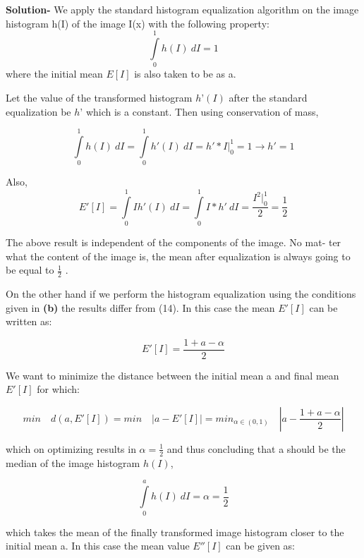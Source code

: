 \documentclass{article}
\begin{document}
\textbf{Solution-}
We apply the standard histogram equalization algorithm on the image
histogram h(I) of the image I(x) with the following property:
\begin{equation}\int\limits_0^1 h(I)\ dI = 1\end{equation}
where the initial mean $E[I]$ is also taken to be as a. 

Let the value of the transformed histogram $h’(I)$ after the standard equalization be $h’$ which is a constant.
Then using conservation of mass,

\begin{equation}\int\limits_0^1 h(I)\ dI = \int\limits_0^1 h'(I)\ dI = h'*I|_0^1 = 1 \rightarrow h' = 1\end{equation}

Also,
\begin{equation}E'[I] = \int\limits_0^1 I h'(I)\ dI = \int\limits_0^1 I*h'\ dI =\frac{I^2|_0^1}{2}=\frac{1}{2}\end{equation}

The above result is independent of the components of the image. No mat-
ter what the content of the image is, the mean after equalization is always
going to be equal to $\frac{1}{2}$ .

On the other hand if we perform the histogram equalization using the
conditions given in \textbf{(b)} the results differ from (14). In this case the mean
$E'[I]$ can be written as:

\begin{equation}E'[I] = \frac{1+a-\alpha}{2}\end{equation}

We want to minimize the distance between the initial mean a and final
mean $E'[I]$ for which:

\begin{equation}min\quad d(a,E'[I]) = min\quad|a-E'[I]| = min_{\alpha\in(0,1)} \quad|a-\frac{1+a-\alpha}{2}|\end{equation}

which on optimizing results in $\alpha = \frac{1}{2}$ and thus concluding that a should
be the median of the image histogram $h(I)$,

\begin{equation}\int\limits_0^a h(I)\ dI = \alpha = \frac{1}{2}\end{equation}

which takes the mean of the finally transformed image histogram closer
to the initial mean a. In this case the mean value $E''[I]$ can be given as:
\end{document}
